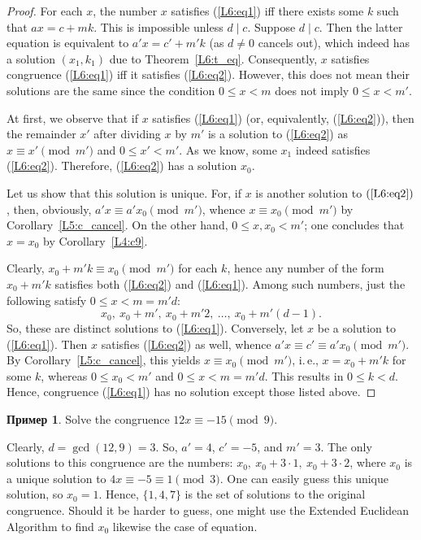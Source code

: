 \documentclass[12pt,notitlepage]{article}
\theoremstyle{plain}
\theoremstyle{definition}
\newtheorem{exm}[thm]{Пример}
\theoremstyle{plain}
\newcommand{\1}{\mathbf{1}}
\newcommand{\0}{\mathbf{0}}
\newcommand{\dvd}{\mathop{\mid}}
\begin{document}
\begin{proof}
	For each $x$, the number $x$ satisfies (\ref{L6:eq1}) iff there exists some $k$ such that $ax = c + mk$. This is impossible unless $d \dvd c$. Suppose $d \dvd c$. Then the latter equation is equivalent to $a'x = c' + m'k$ (as $d \neq 0$ cancels out), which indeed has a solution $(x_1, k_1)$ due to Theorem~\ref{L6:t_eq}. Consequently, $x$  satisfies congruence (\ref{L6:eq1}) iff it satisfies (\ref{L6:eq2}). However, this does not mean their solutions are the same since the condition $0 \leq x < m$ does not imply $0 \leq x < m'$.
	
	At first, we observe that if $x$ satisfies (\ref{L6:eq1}) (or, equivalently, (\ref{L6:eq2})), then the remainder $x'$ after dividing $x$ by $m'$ is a solution to (\ref{L6:eq2}) as  $x \equiv x' \pmod {m'}$ and $0 \leq x' < m'$. As we know, some $x_1$ indeed satisfies (\ref{L6:eq2}). Therefore, (\ref{L6:eq2}) has a solution $x_0$.
	
	Let us show that this solution is unique. For, if $x$ is another solution to $(\ref{L6:eq2})$, then, obviously, $a'x \equiv a' x_0 \pmod{m'}$, whence $x \equiv x_0 \pmod{m'}$ by Corollary~\ref{L5:c_cancel}. On the other hand, $0 \leq x, x_0 < m'$; one concludes that $x = x_0$ by Corollary~\ref{L4:c9}.
	
	Clearly, $x_0 + m' k \equiv x_0 \pmod {m'}$ for each $k$, hence any number of the form $x_0 + m' k$ satisfies both (\ref{L6:eq2}) and (\ref{L6:eq1}). Among such numbers, just the following satisfy $0 \leq x < m = m'd$:
	$$x_0,\ x_0 + m',\ x_0 + m'2,\ \ldots,\ x_0 + m'(d - 1).$$
	So, these are distinct solutions to (\ref{L6:eq1}). Conversely, let $x$ be a solution to (\ref{L6:eq1}). Then $x$ satisfies (\ref{L6:eq2}) as well, whence $a' x \equiv c' \equiv a' x_0 \pmod {m'}$. By Corollary~\ref{L5:c_cancel}, this yields $x \equiv x_0 \pmod {m'}$, i.\,e., $x = x_0 + m'k$ for some $k$, whereas $0 \leq x_0 < m'$ and $0 \leq x < m = m'd$. This results in $0 \leq k < d$. Hence, congruence (\ref{L6:eq1}) has no solution except those listed above.
\end{proof}

\begin{exm}
	Solve the congruence $12 x \equiv -15 \pmod 9$.
	
	Clearly, $d = \gcd(12, 9) = 3$. So, $a' = 4$, $c' = -5$, and $m' = 3$. The only solutions to this congruence are the numbers:
	$x_0,\ x_0 + 3\cdot 1,\ x_0 + 3\cdot 2$,
	where $x_0$ is a unique solution to $4 x \equiv -5 \equiv 1 \pmod 3$. One can easily guess this unique solution, so $x_0 = 1$. Hence, $\{1, 4, 7\}$ is the set of solutions to the original congruence. Should it be harder to guess, one might use the Extended Euclidean Algorithm to find $x_0$ likewise the case of equation.
\end{exm}
\end{document}
